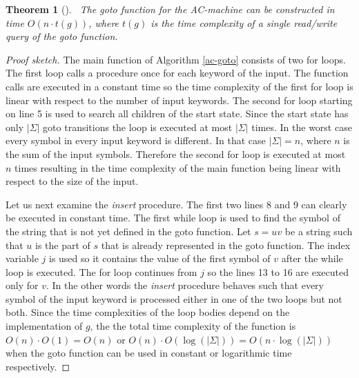 \documentclass[english,twoside,censored,csm,algorithms-track-2020]{HYthesisML}
\theoremstyle{plain}
\newtheorem{theorem}{Theorem}[chapter]
\theoremstyle{definition}
\numberwithin{testexample}{chapter}
\begin{document}
\begin{theorem}[]~\label{thm-time-goto}
  The goto function for the AC-machine can be constructed in time $O(n \cdot t(g))$,
  where $t(g)$ is the time complexity of a single read/write query of the
  goto function.
\end{theorem}
\begin{proof}[Proof sketch]
The main function of Algorithm \ref{ac-goto} consists of two for loops.
The first loop calls a procedure once for each keyword of the input. The function calls are
executed in a constant time so the time complexity of the first for loop is linear with respect
to the number of input keywords. The second for loop starting on line 5 is used to search all
children of the start state. Since the start state has only $|\Sigma|$ goto transitions the loop
is executed at most $|\Sigma|$ times. In the worst case every symbol
in every input keyword is different. In that case $|\Sigma| = n$, where $n$ is the sum of the input
symbols. Therefore the second for loop is executed at most $n$ times resulting in the time complexity of
the main function being linear with respect to the size of the input.

Let us next examine the \textit{insert} procedure. The first two lines 8 and 9 can clearly be executed in
constant time. The first while loop is used to find the symbol of the string that is not yet defined
in the goto function. Let $s=uv$ be a string such that $u$ is the part of $s$ that is already represented in the
goto function. The index variable $j$ is used so it contains the value of the first symbol of $v$ after
the while loop is executed. The for loop continues from $j$ so the lines 13 to 16 are executed
only for $v$. In the other words the \textit{insert} procedure behaves such that every symbol of
the input keyword is processed either in one of the two loops but not both. Since the time complexities
of the loop bodies depend on the implementation of $g$, the the total time complexity of the function
is $O(n)\cdot O(1) = O(n)$ or $O(n)\cdot O(\log(|\Sigma|)) = O(n\cdot\log(|\Sigma|))$ when the
goto function can be used in constant or logarithmic time respectively.
\end{proof}
\end{document}
